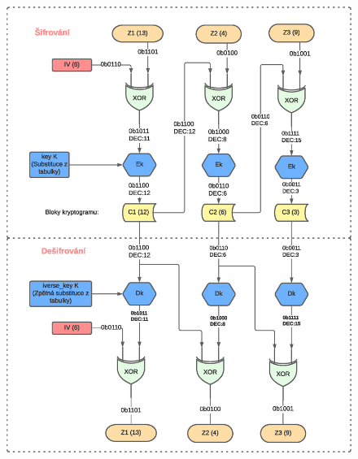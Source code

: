 \documentclass[10pt, a4paper]{article}%
\begin{document}
\begin{enumerate}
		\begin{figure}[ht!]
			\centering
			\includegraphics[height = 0.6\textheight]{CBC_drawing.eps}
		\end{figure}
 	
	\end{enumerate}
\clearpage
\end{document}
